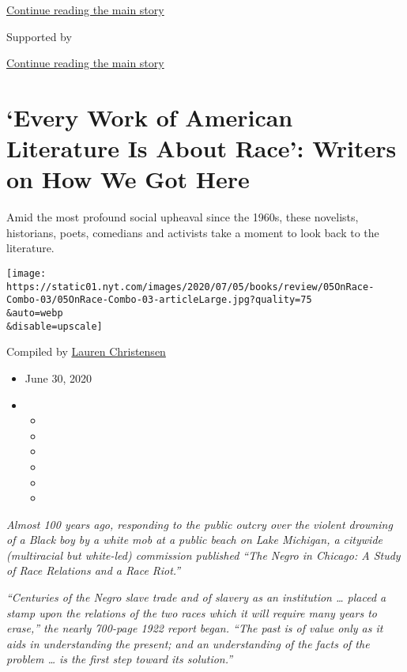 \protect\hyperlink{after-top}{Continue reading the main story}

Supported by

\protect\hyperlink{after-sponsor}{Continue reading the main story}

\hypertarget{every-work-of-american-literature-is-about-race-writers-on-how-we-got-here}{%
\section{`Every Work of American Literature Is About Race': Writers on
How We Got
Here}\label{every-work-of-american-literature-is-about-race-writers-on-how-we-got-here}}

Amid the most profound social upheaval since the 1960s, these novelists,
historians, poets, comedians and activists take a moment to look back to
the literature.

\texttt{[image: https://static01.nyt.com/images/2020/07/05/books/review/05OnRace-Combo-03/05OnRace-Combo-03-articleLarge.jpg?quality=75\\\&auto=webp\\\&disable=upscale]}

Compiled by \href{https://www.nytimes.com/by/lauren-christensen}{Lauren
Christensen}

\begin{itemize}
\item
  June 30, 2020
\item
  \begin{itemize}
  \item
  \item
  \item
  \item
  \item
  \item
  \end{itemize}
\end{itemize}

\emph{Almost 100 years ago, responding to the public outcry over the
violent drowning of a Black boy by a white mob at a public beach on Lake
Michigan, a citywide (multiracial but white-led) commission published
``The Negro in Chicago: A Study of Race Relations and a Race Riot.''}

\emph{``Centuries of the Negro slave trade and of slavery as an
institution \ldots{} placed a stamp upon the relations of the two races
which it will require many years to erase,'' the nearly 700-page 1922
report began. ``The past is of value only as it aids in understanding
the present; and an understanding of the facts of the problem \ldots{}
is the first step toward its solution.''}

